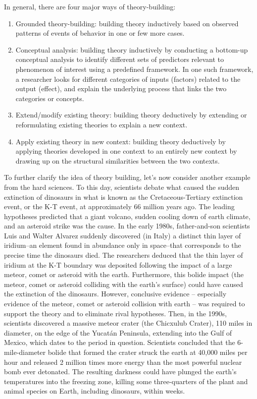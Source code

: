\documentclass{book}
\begin{document}
In general, there are four major ways of theory-building:

\begin{enumerate}
\def\labelenumi{\arabic{enumi}.}
\item
  Grounded theory-building: building theory inductively based on observed
  patterns of events of behavior in one or few more cases.
\item
  Conceptual analysis: building theory inductively by conducting a bottom-up
  conceptual analysis to identify different sets of predictors relevant to
  phenomenon of interest using a predefined framework. In one such framework,
  a researcher looks for different categories of inputs (factors) related to
  the output (effect), and explain the underlying process that links the two
  categories or concepts.
\item
  Extend/modify existing theory: building theory deductively by extending or
  reformulating existing theories to explain a new context.
\item
  Apply existing theory in new context: building theory deductively by
  applying theories developed in one context to an entirely new context by
  drawing up on the structural similarities between the two contexts.
\end{enumerate}

To further clarify the idea of theory building, let's now consider another
example from the hard sciences. To this day, scientists debate what caused the
sudden extinction of dinosaurs in what is known as the Cretaceous-Tertiary
extinction event, or the K-T event, at approximately 66 million years ago. The
leading hypotheses predicted that a giant volcano, sudden cooling down of
earth climate, and an asteroid strike was the cause. In the early 1980s,
father-and-son scientists Luis and Walter Alvarez suddenly discovered (in
Italy) a distinct thin layer of iridium--an element found in abundance only in
space--that corresponds to the precise time the dinosaurs died. The
researchers deduced that the thin layer of iridium at the K-T boundary was
deposited following the impact of a large meteor, comet or asteroid with the
earth. Furthermore, this bolide impact (the meteor, comet or asteroid
colliding with the earth's surface) could have caused the extinction of the
dinosaurs. However, conclusive evidence -- especially evidence of the meteor,
comet or asteroid collision with earth -- was required to support the theory
and to eliminate rival hypotheses. Then, in the 1990s, scientists discovered a
massive meteor crater (the Chicxulub Crater), 110 miles in diameter, on the
edge of the Yucatán Peninsula, extending into the Gulf of Mexico, which dates
to the period in question. Scientists concluded that the 6-mile-diameter
bolide that formed the crater struck the earth at 40,000 miles per hour and
released 2 million times more energy than the most powerful nuclear bomb ever
detonated. The resulting darkness could have plunged the earth's temperatures
into the freezing zone, killing some three-quarters of the plant and animal
species on Earth, including dinosaurs, within weeks.
\end{document}
